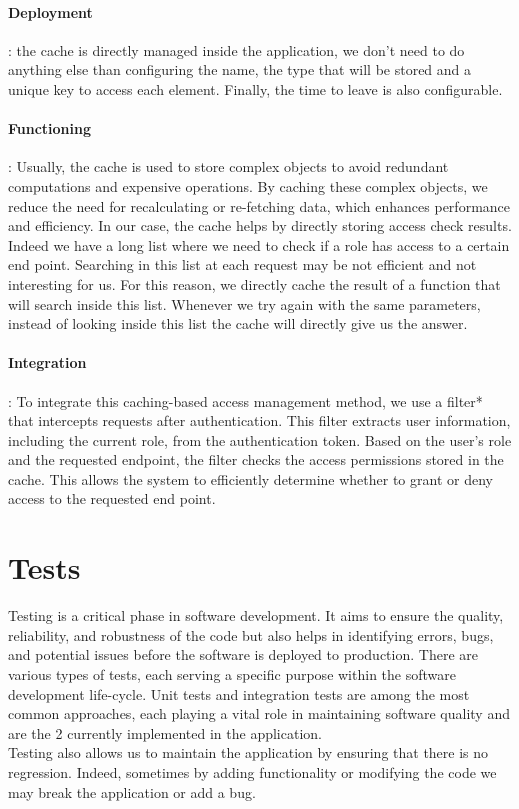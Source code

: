 \documentclass[12pt,a4paper,table,english]{article}
\begin{document}
	
	\paragraph{Deployment}: the cache is directly managed inside the application, we don't need to do anything else than configuring the name, the type that will be stored and a unique key to access each element. Finally, the time to leave is also configurable. 
	
	
	\paragraph{Functioning}: Usually, the cache is used to store complex objects to avoid redundant computations and expensive operations. By caching these complex objects, we reduce the need for recalculating or re-fetching data, which enhances performance and efficiency.  
	In our case, the cache helps by directly storing access check results. Indeed we have a long list where we need to check if a role has access to a certain end point. Searching in this list at each request may be not efficient and not interesting for us. For this reason, we directly cache the result of a function that will search inside this list. Whenever we try again with the same parameters, instead of looking inside this list the cache will directly give us the answer. 
	
	
	\paragraph{Integration}: To integrate this caching-based access management method, we use a filter* that intercepts requests after authentication. This filter extracts user information, including the current role, from the authentication token. Based on the user's role and the requested endpoint, the filter checks the access permissions stored in the cache. This allows the system to efficiently determine whether to grant or deny access to the requested end point. 
	
	\newpage
	
	\section{Tests}
	
	Testing is a critical phase in software development. It aims to ensure the quality, reliability, and robustness of the code but also helps in identifying errors, bugs, and potential issues before the software is deployed to production. There are various types of tests, each serving a specific purpose within the software development life-cycle. Unit tests and integration tests\citep{TESTBD, TESTOC} are among the most common approaches, each playing a vital role in maintaining software quality and are the 2 currently implemented in the application.\\
	Testing also allows us to maintain the application by ensuring that there is no regression. Indeed, sometimes by adding functionality or modifying the code we may break the application or add a bug.
	
\end{document}
